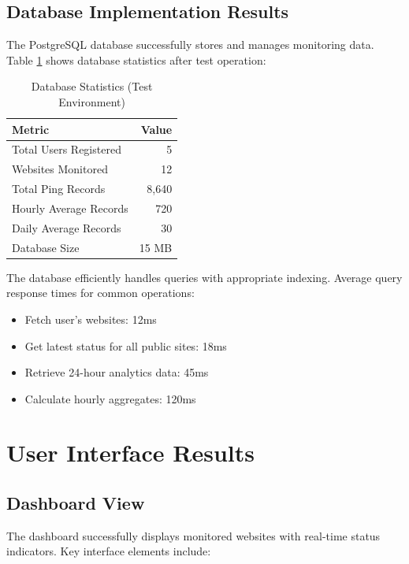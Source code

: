 \subsection{Database Implementation Results}

The PostgreSQL database successfully stores and manages monitoring data. Table \ref{tab:db-statistics} shows database statistics after test operation:

\begin{table}[htbp]
    \centering
    \caption{Database Statistics (Test Environment)}
    \label{tab:db-statistics}
    \begin{tabular}{lr}
        \toprule
        \textbf{Metric} & \textbf{Value} \\
        \midrule
        Total Users Registered & 5 \\
        Websites Monitored & 12 \\
        Total Ping Records & 8,640 \\
        Hourly Average Records & 720 \\
        Daily Average Records & 30 \\
        Database Size & 15 MB \\
        \bottomrule
    \end{tabular}
\end{table}

The database efficiently handles queries with appropriate indexing. Average query response times for common operations:

\begin{itemize}
    \item Fetch user's websites: 12ms
    \item Get latest status for all public sites: 18ms
    \item Retrieve 24-hour analytics data: 45ms
    \item Calculate hourly aggregates: 120ms
\end{itemize}

\section{User Interface Results}

\subsection{Dashboard View}

The dashboard successfully displays monitored websites with real-time status indicators. Key interface elements include:

